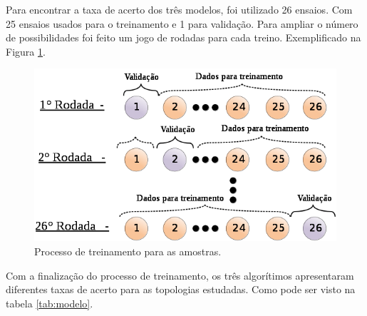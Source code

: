 \documentclass[a4paper, 10pt]{article}
\begin{document}
Para encontrar a taxa de acerto dos três modelos, foi utilizado
26 ensaios. Com 25 ensaios usados para o treinamento e 1 para
validação. Para ampliar o número de possibilidades 
foi feito um jogo de rodadas para cada treino. Exemplificado 
na Figura \ref{fig_treinamento}.

\begin{figure}[!h]
    \caption{\label{fig_treinamento}Processo de treinamento para as amostras.}
	    \begin{center}
            \includegraphics[scale=0.5]{../fotos/principio/rodizio.png}
	    \end{center}
\end{figure}

Com a finalização do processo de treinamento, os três algorítimos 
apresentaram diferentes taxas de acerto para as topologias estudadas.
Como pode ser visto na tabela \ref{tab:modelo}. 
\end{document}
